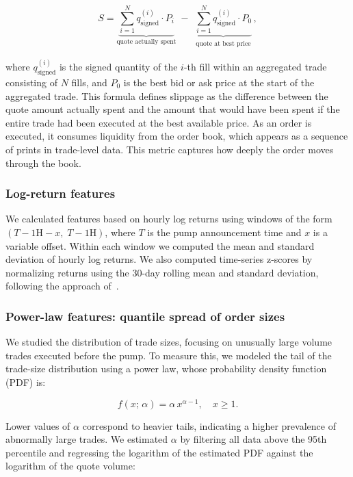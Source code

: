 \documentclass{ieeeaccess}
\begin{document}
\begin{equation}
    S = \underbrace{\sum_{i=1}^{N} q^{(i)}_{\mathrm{signed}} \cdot P_i}_{\text{quote actually spent}} \;-\; \underbrace{\sum_{i=1}^{N} q^{(i)}_{\mathrm{signed}} \cdot P_0}_{\substack{\text{quote at best price}}},
    \label{eq:slippage_loss}
\end{equation}

where $q^{(i)}_{\mathrm{signed}}$ is the signed quantity of the $i$-th fill within an aggregated trade consisting of $N$ fills, and $P_0$ is the best bid or ask price at the start of the aggregated trade. This formula defines slippage as the difference between the quote amount actually spent and the amount that would have been spent if the entire trade had been executed at the best available price. As an order is executed, it consumes liquidity from the order book, which appears as a sequence of prints in trade-level data. This metric captures how deeply the order moves through the book.

\subsubsection{Log-return features}

We calculated features based on hourly log returns using windows of the form $(T{-}1\mathrm{H}{-}x,\; T{-}1\mathrm{H})$, where $T$ is the pump announcement time and $x$ is a variable offset. Within each window we computed the mean and standard deviation of hourly log returns. We also computed time-series z-scores by normalizing returns using the 30-day rolling mean and standard deviation, following the approach of~\cite{pd_anatomy}.

\subsubsection{Power-law features: quantile spread of order sizes}

We studied the distribution of trade sizes, focusing on unusually large volume trades executed before the pump. To measure this, we modeled the tail of the trade-size distribution using a power law, whose probability density function (PDF) is:

\begin{equation}
    f(x;\, \alpha) = \alpha\, x^{\alpha - 1}, \quad x \geq 1.
    \label{eq:powerlaw_pdf}
\end{equation}

Lower values of $\alpha$ correspond to heavier tails, indicating a higher prevalence of abnormally large trades. We estimated $\alpha$ by filtering all data above the 95th percentile and regressing the logarithm of the estimated PDF against the logarithm of the quote volume:
\end{document}
